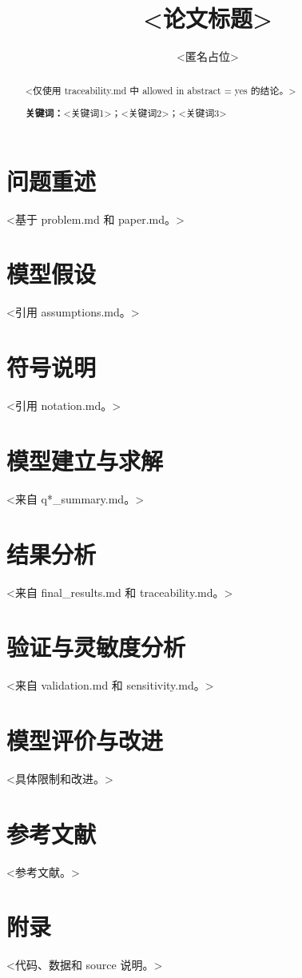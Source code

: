 \documentclass[UTF8]{ctexart}
\title{<论文标题>}
\author{<匿名占位>}
\date{}
\begin{document}
\maketitle

\begin{abstract}
<仅使用 traceability.md 中 allowed in abstract = yes 的结论。>

\textbf{关键词：}<关键词1>；<关键词2>；<关键词3>
\end{abstract}

\section{问题重述}
<基于 problem.md 和 paper.md。>

\section{模型假设}
<引用 assumptions.md。>

\section{符号说明}
<引用 notation.md。>

\section{模型建立与求解}
<来自 q*_summary.md。>

\section{结果分析}
<来自 final_results.md 和 traceability.md。>

\section{验证与灵敏度分析}
<来自 validation.md 和 sensitivity.md。>

\section{模型评价与改进}
<具体限制和改进。>

\section*{参考文献}
<参考文献。>

\appendix
\section{附录}
<代码、数据和 source 说明。>
\end{document}
